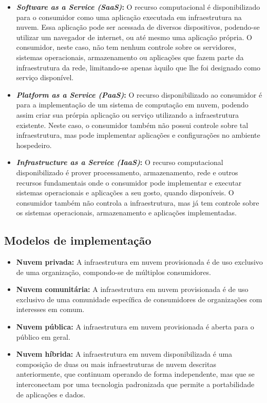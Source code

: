 \documentclass[
	12pt,				%
	openright,			%
	twoside,			%
	a4paper,			%
	english,			%
	french,				%
	spanish,			%
	brazil				%
	]{abntex2}
\begin{document}
\begin{itemize}
	\item \textbf{\emph{Software as a Service (SaaS)}:} O recurso computacional é disponibilizado para o consumidor como uma aplicação executada em infraestrutura na nuvem. Essa aplicação pode ser acessada de diversos dispositivos, podendo-se utilizar um navegador de internet, ou até mesmo uma aplicação própria. O consumidor, neste caso, não tem nenhum controle sobre os servidores, sistemas operacionais, armazenamento ou aplicações que fazem parte da infraestrutura da rede, limitando-se apenas àquilo que lhe foi designado como serviço disponível.
	\item \textbf{\emph{Platform as a Service (PaaS)}:} O recurso disponibilizado ao consumidor é para a implementação de um sistema de computação em nuvem, podendo assim criar sua prórpia aplicação ou serviço utilizando a infraestrutura existente. Neste caso, o consumidor também não possui controle sobre tal infraestrutura, mas pode implementar aplicações e configurações no ambiente hospedeiro.
	\item \textbf{\emph{Infrastructure as a Service (IaaS)}:} O recurso computacional disponibilizado é prover processamento, armazenamento, rede e outros recursos fundamentais onde o consumidor pode implementar e executar sistemas operacionais e aplicações a seu gosto, quando disponíveis. O consumidor também não controla a infraestrutura, mas já tem controle sobre os sistemas operacionais, armazenamento e aplicações implementadas.
\end{itemize}


\subsection{Modelos de implementação}

\begin{itemize}
	\item \textbf{Nuvem privada:} A infraestrutura em nuvem provisionada é de uso exclusivo de uma organização, compondo-se de múltiplos consumidores.
	\item \textbf{Nuvem comunitária:} A infraestrutura em nuvem provisionada é de uso exclusivo de uma comunidade específica de consumidores de organizações com interesses em comum.
	\item \textbf{Nuvem pública:} A infraestrutura em nuvem provisionada é aberta para o público em geral.
	\item \textbf{Nuvem híbrida:} A infraestrutura em nuvem disponibilizada é uma composição de duas ou mais infraestruturas de nuvem descritas anteriormente, que continuam operando de forma independente, mas que se interconectam por uma tecnologia padronizada que permite a portabilidade de aplicações e dados.
\end{itemize}
\end{document}
